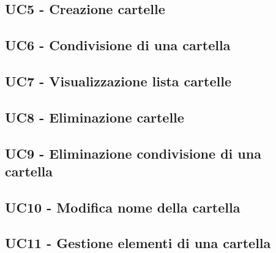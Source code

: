 
    \subsection{UC5 - Creazione cartelle}

    \subsection{UC6 - Condivisione di una cartella}

    \subsection{UC7 - Visualizzazione lista cartelle}

    \subsection{UC8 - Eliminazione cartelle}

    \subsection{UC9 - Eliminazione condivisione di una cartella}

    \subsection{UC10 - Modifica nome della cartella}

    \subsection{UC11 - Gestione elementi di una cartella}